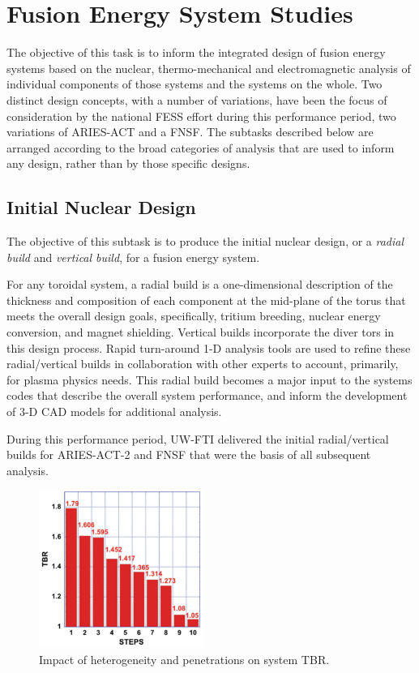 \section{Fusion Energy System Studies}

The objective of this task is to inform the integrated design of fusion energy
systems based on the nuclear, thermo-mechanical and electromagnetic analysis
of individual components of those systems and the systems on the whole.  Two
distinct design concepts, with a number of variations, have been the focus of
consideration by the national \gls{FESS} effort during this performance
period, two variations of ARIES-ACT and a \gls{FNSF}.  The subtasks described
below are arranged according to the broad categories of analysis that are used
to inform any design, rather than by those specific designs.

\subsection{Initial Nuclear Design}

The objective of this subtask is to produce the initial nuclear design, or a
\emph{radial build} and \emph{vertical build}, for a fusion energy system.

For any toroidal system, a radial build is a one-dimensional description of
the thickness and composition of each component at the mid-plane of the torus
that meets the overall design goals, specifically, tritium breeding, nuclear
energy conversion, and magnet shielding.  Vertical builds incorporate the
diver tors in this design process.  Rapid turn-around 1-D analysis tools are
used to refine these radial/vertical builds in collaboration with other
experts to account, primarily, for plasma physics needs.  This radial build
becomes a major input to the systems codes that describe the overall system
performance, and inform the development of 3-D CAD models for additional
analysis.

During this performance period, \gls{UW-FTI} delivered the initial
radial/vertical builds for ARIES-ACT-2 and \gls{FNSF} that were the basis of
all subsequent analysis.

\begin{figure}
\centering
\includegraphics[width=0.48\textwidth]{imgs/aries-act-2-tbr.png}
\caption{\label{fig:aries-act-2-tbr}Impact of heterogeneity and penetrations on system \gls{TBR}.}
\end{figure}

